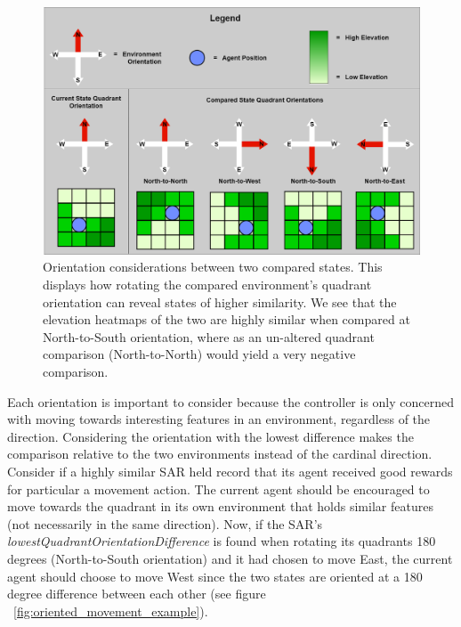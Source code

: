 \begin{figure}[H]
  \includegraphics[width=1.0\columnwidth]{Figures/quadrant_orientations.png}
  \caption{Orientation considerations between two compared states. This displays how rotating the compared environment's quadrant orientation can reveal states of higher similarity. We see that the elevation heatmaps of the two are highly similar when compared at North-to-South orientation, where as an un-altered quadrant comparison (North-to-North) would yield a very negative comparison.}
  \label{fig:quadrant_orientations}
\end{figure}

Each orientation is important to consider because the controller is only concerned with moving towards interesting features in an environment, regardless of the direction.
Considering the orientation with the lowest difference makes the comparison relative to the two environments instead of the cardinal direction.
Consider if a highly similar SAR held record that its agent received good rewards for particular a movement action.
The current agent should be encouraged to move towards the quadrant in its own environment that holds similar features (not necessarily in the same direction).
Now, if the SAR's \textit{lowestQuadrantOrientationDifference} is found when rotating its quadrants 180 degrees (North-to-South orientation) and it had chosen to move East, the current agent should choose to move West since the two states are oriented at a 180 degree difference between each other (see figure ~\ref{fig:oriented_movement_example}).

